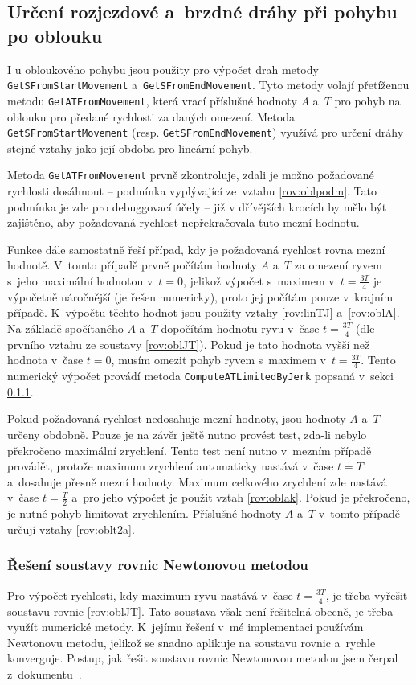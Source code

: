 	\subsection{Určení rozjezdové a~brzdné dráhy při pohybu po oblouku}\label{kap:rych-obl}
	I u obloukového pohybu jsou použity pro výpočet drah metody {\tt GetSFromStartMovement} a~{\tt GetSFromEndMovement}. Tyto metody volají přetíženou metodu {\tt GetATFromMovement}, která vrací příslušné hodnoty $A$ a~$T$ pro pohyb na oblouku pro předané rychlosti za daných omezení. Metoda {\tt GetSFromStartMovement} (resp. {\tt GetSFromEndMovement}) využívá pro určení dráhy stejné vztahy jako její obdoba pro lineární pohyb.
	
	Metoda {\tt GetATFromMovement} prvně zkontroluje, zdali je možno požadované rychlosti dosáhnout -- podmínka vyplývající ze~vztahu \ref{rov:oblpodm}. Tato podmínka je zde pro debuggovací účely -- již v dřívějších krocích by mělo být zajištěno, aby požadovaná rychlost nepřekračovala tuto mezní hodnotu.
	
	Funkce dále samostatně řeší případ, kdy je požadovaná rychlost rovna mezní hodnotě. V~tomto případě prvně počítám hodnoty $A$ a~$T$ za omezení ryvem s~jeho maximální hodnotou v~$t=0$, jelikož výpočet s~maximem v~$t=\frac{3T}{4}$ je výpočetně náročnější (je řešen numericky), proto jej počítám pouze v~krajním případě. K~výpočtu těchto hodnot jsou použity vztahy \ref{rov:linTJ} a~\ref{rov:oblA}. Na základě spočítaného $A$ a~$T$ dopočítám hodnotu ryvu v~čase $t=\frac{3T}{4}$ (dle prvního vztahu ze soustavy \ref{rov:oblJT}). Pokud je tato hodnota vyšší než hodnota v~čase $t=0$, musím omezit pohyb ryvem s~maximem v~$t=\frac{3T}{4}$. Tento numerický výpočet provádí metoda {\tt ComputeATLimitedByJerk} popsaná v~sekci \ref{kap:newton}. 
	
	Pokud požadovaná rychlost nedosahuje mezní hodnoty, jsou hodnoty $A$ a~$T$ určeny obdobně. Pouze je na závěr ještě nutno provést test, zda-li nebylo překročeno maximální zrychlení. Tento test není nutno v~mezním případě provádět, protože maximum zrychlení automaticky nastává v~čase $t=T$ a~dosahuje přesně mezní hodnoty. Maximum celkového zrychlení zde nastává v~čase $t=\frac{T}{2}$ a~pro jeho výpočet je použit vztah \ref{rov:oblak}. Pokud je překročeno, je nutné pohyb limitovat zrychlením. Příslušné hodnoty $A$ a~$T$ v~tomto případě určují vztahy \ref{rov:oblt2a}.
	
		\subsubsection{Řešení soustavy rovnic Newtonovou metodou}\label{kap:newton}
		Pro výpočet rychlosti, kdy maximum ryvu nastává v~čase $t=\frac{3T}{4}$, je třeba vyřešit soustavu rovnic \ref{rov:oblJT}. Tato soustava však není řešitelná obecně, je třeba využít numerické metody. K~jejímu řešení v~mé implementaci používám Newtonovu metodu, jelikož se snadno aplikuje na soustavu rovnic a~rychle konverguje\cite{wiki:newton}. Postup, jak řešit soustavu rovnic Newtonovou metodou jsem čerpal z~dokumentu~\cite{newton}.
		
